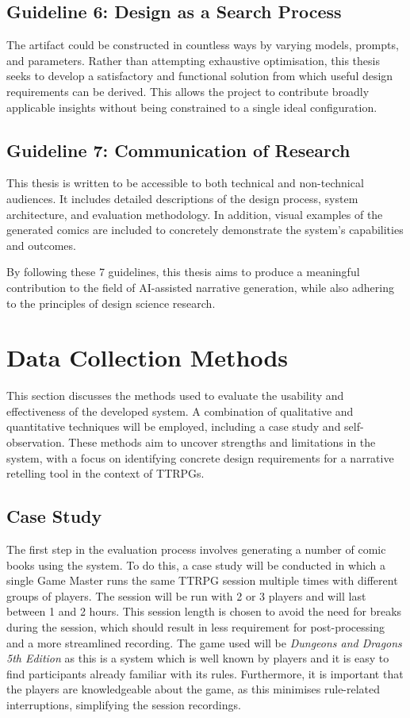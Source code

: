 \subsection*{Guideline 6: Design as a Search Process}
The artifact could be constructed in countless ways by varying models, prompts, and parameters. Rather than attempting exhaustive optimisation, this thesis seeks to develop a satisfactory and functional solution from which useful design requirements can be derived. This allows the project to contribute broadly applicable insights without being constrained to a single ideal configuration.

\subsection*{Guideline 7: Communication of Research}
This thesis is written to be accessible to both technical and non-technical audiences. It includes detailed descriptions of the design process, system architecture, and evaluation methodology. In addition, visual examples of the generated comics are included to concretely demonstrate the system's capabilities and outcomes.

By following these 7 guidelines, this thesis aims to produce a meaningful contribution to the field of AI-assisted narrative generation, while also adhering to the principles of design science research.

\section{Data Collection Methods} \label{sec:DataCollection}
This section discusses the methods used to evaluate the usability and effectiveness of the developed system. A combination of qualitative and quantitative techniques will be employed, including a case study and self-observation. These methods aim to uncover strengths and limitations in the system, with a focus on identifying concrete design requirements for a narrative retelling tool in the context of TTRPGs.

\subsection*{Case Study}
The first step in the evaluation process involves generating a number of comic books using the system. To do this, a case study will be conducted in which a single Game Master runs the same TTRPG session multiple times with different groups of players. The session will be run with 2 or 3 players and will last between 1 and 2 hours. This session length is chosen to avoid the need for breaks during the session, which should result in less requirement for post-processing and a more streamlined recording. The game used will be \textit{Dungeons and Dragons 5th Edition} as this is a system which is well known by players and it is easy to find participants already familiar with its rules. Furthermore, it is important that the players are knowledgeable about the game, as this minimises rule-related interruptions, simplifying the session recordings.

